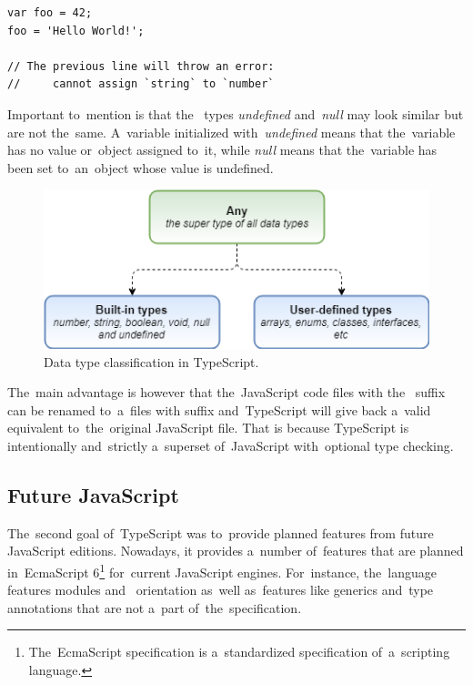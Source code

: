 \pagebreak
\begin{lstlisting}[caption=An~example of~TypeScript's type inference. The~type
of~the~variable is inferred by~the~TypeScript Language Service based on~its
value.,
label=TypeScriptInference,language=HTML]
var foo = 42;
foo = 'Hello World!';

// The previous line will throw an error: 
// 	   cannot assign `string` to `number`
\end{lstlisting}

Important to~mention is that the~ types \textit{undefined}
and~\textit{null} may look similar but are not the~same. A~variable initialized
with~\textit{undefined} means that the~variable has no value or~object assigned
to~it, while \textit{null} means that the~variable has been set to~an~object
whose value is undefined.

\begin{figure}[!hbt]
	\centering
	\includegraphics[scale=0.65]{./obrazky-figures/typescript-types.png}
	\caption{Data type classification in TypeScript.}
	\label{TypeScriptDataTypes}
\end{figure}

The~main advantage is however that the~JavaScript code files with the~
suffix can be renamed to~a~files with  suffix and~TypeScript will give
back a~valid equivalent to~the~original JavaScript file. That is because
TypeScript is intentionally and~strictly a~superset of~JavaScript with~optional type checking.

\subsection{Future JavaScript}
The~second goal of~TypeScript was to~provide planned features from future
JavaScript editions. Nowadays, it provides a~number of~features that are planned
in~EcmaScript 6\footnote{The~EcmaScript specification is a~standardized
specification of~a~scripting language.} for~current JavaScript engines.
For~instance, the~language features modules and~ orientation
as~well as~features like generics and~type annotations that are not a~part
of~the~specification.

